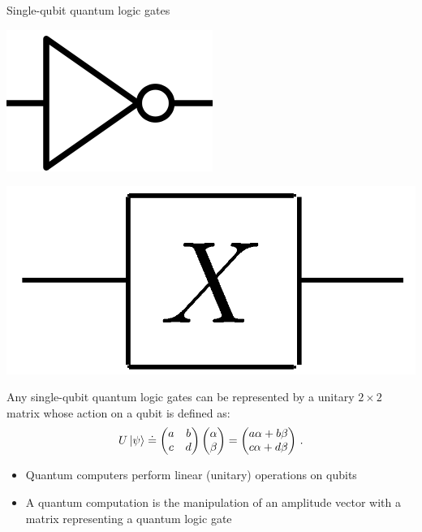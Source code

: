 \documentclass[10pt]{beamer}
\begin{document}
{
\begin{frame}[fragile]{Single-qubit quantum logic gates}

\begin{minipage}[c]{0.49\textwidth}
\centering
\includegraphics[scale=0.18]{not_gate_c.png}
\end{minipage}%
\begin{minipage}[c]{0.49\textwidth}
\centering
\includegraphics[scale=0.1]{xcircuit.png}
\end{minipage}
\vspace{0.5cm}

Any single-qubit quantum logic gates can be represented by a unitary $2\times 2$ matrix whose action on a qubit is defined as:
\begin{equation}
\label{equ:unitarytransformation}
U \ket{\psi} \doteq \begin{pmatrix}
 a & b \\ 
 c & d
 \end{pmatrix} \begin{pmatrix} \alpha\\ \beta \end{pmatrix}= \begin{pmatrix} a\alpha+b\beta\\c\alpha+d\beta\end{pmatrix}\, .
\end{equation}

\begin{itemize}
\item Quantum computers perform linear (unitary) operations on qubits
\item A quantum computation is the manipulation of an amplitude vector with a matrix representing a quantum logic gate 
\end{itemize}


\end{frame}
}
\end{document}
